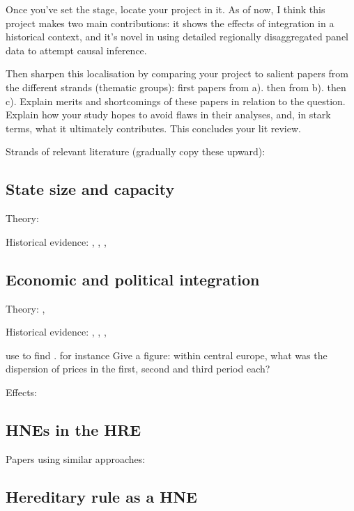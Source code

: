 \documentclass{article}
\begin{document}
Once you've set the stage, locate your project in it.
As of now, I think this project makes two main contributions: it shows the effects of integration in a historical context, and it's novel in using detailed regionally disaggregated panel data to attempt causal inference.

Then sharpen this localisation by comparing your project to salient papers from the different strands (thematic groups): first papers from a). then from b). then c). Explain merits and shortcomings of these papers in relation to the question. Explain how your study hopes to avoid flaws in their analyses, and, in stark terms, what it ultimately contributes. This concludes your lit review.

Strands of relevant literature (gradually copy these upward): 

\subsection{State size and capacity}

Theory: \cite{as1997}

Historical evidence: \cite{cervellati2022}, \cite{koyama2017}, \cite{schoenholzer2018}, \cite{sng2014}

\subsection{Economic and political integration}

Theory: \cite{sapir2011}, \cite{asw2000}

Historical evidence: \cite{chilosi2013}, \cite{kindleberger1975}, \cite{wolf2009}, \cite{chen2004}

\cite{chilosi2013} use  to find . for instance Give a figure: within central europe, what was the dispersion of prices in the first, second and third period each?

Effects: \cite{campos2019}

\subsection{HNEs in the HRE}

Papers using similar approaches: \cite{cantoni2011}

\subsection{Hereditary rule as a HNE}
\end{document}
